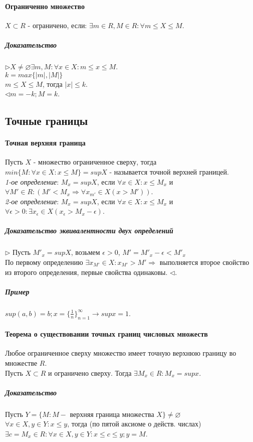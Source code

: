 \documentclass[10pt]{article}
\begin{document}
			\paragraph{Ограниченно множество} $X \subset R$ - ограничено, если: $\exists m \in R, M \in R : \forall m \le X \le M$.
			\subparagraph{Доказательство} $\rhd X \ne \varnothing \exists m, M : \forall x \in X : m \le x \le M$.\\
			$k = max\{|m|,|M|\}$\\
			$m \le X \le M$, тогда $|x| \le k$.\\
			$\lhd m = -k; M = k$.
		\subsection{Точные границы}
			\paragraph{Точная верхняя граница} Пусть $X$ - множество ограниченное сверху, тогда $min\{M:\forall x \in X : x \le M\} = sup X$ - называется точной верхней границей.\\
			\textit{1-ое определение}: $M_x = sup X$, если $\forall x \in X : x \le M_x$ и $\forall M' \in R : (M' < M_x \Rightarrow \forall x_{m'} \in X (x > M'))$.\\
			\textit{2-ое определение}: $M_x = sup X$, если $\forall x \in X : x \le M_x$ и $\forall \epsilon > 0 : \exists x_\epsilon \in X (x_\epsilon > M_x - \epsilon)$.
			\subparagraph{Доказательство эквивалентности двух определений}
			$\rhd$ Пусть ${M'}_x = sup X$, возьмем $\epsilon > 0$, $M' = {M'}_x - \epsilon < {M'}_x$\\
			По первому определению $\exists x_{M'} \in X : x_{M'} > M' \Rightarrow$ выполняется второе свойство из второго определения, первые свойства одинаковы. $\lhd$.
			\subparagraph{Пример}
			$sup (a,b) = b; x = \{\frac{1}{n}\}_{n=1}^\infty \to sup x = 1$.
			\paragraph{Теорема о существовании точных границ числовых множеств}
			Любое ограниченное сверху множество имеет точную верхнюю границу во множестве $R$.\\
			Пусть $X \subset R$ и ограничено сверху. Тогда $\exists M_x \in R : M_x = sup x$.
			\subparagraph{Доказательство}
			Пусть $Y = \{M : M -$ верхняя граница множества $X\} \neq \varnothing$\\
			$\forall x \in X, y \in Y : x \le y$, тогда (по пятой аксиоме о действ. числах) $\exists c = M_x \in R : \forall x \in X, y \in Y : x \le c \le y; y = M$.
\end{document}
